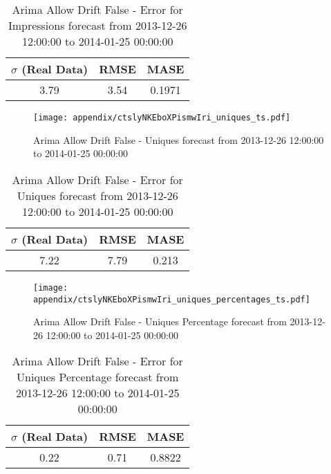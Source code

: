 \begin{table}[H]
\centering
\footnotesize
\begin{tabular}{ccc}
$\sigma$ (Real Data) & RMSE & MASE   \\ \hline
3.79 & 3.54 & 0.1971 \\
\end{tabular}

\vspace{0.5cm}

\caption{
Arima Allow Drift False - Error for Impressions forecast from 2013-12-26 12:00:00 to 2014-01-25 00:00:00}
\end{table}

\begin{figure}[H] \begin{center} \leavevmode
\texttt{[image: appendix/ctslyNKEboXPismwIri\_uniques\_ts.pdf]} \caption{
Arima Allow Drift False - Uniques forecast from 2013-12-26 12:00:00 to 2014-01-25 00:00:00} \label{fig:appendix/ctslyNKEboXPismwIri_uniques_ts.pdf} \end{center}
\end{figure}

\begin{table}[H]
\centering
\footnotesize
\begin{tabular}{ccc}
$\sigma$ (Real Data) & RMSE & MASE   \\ \hline
7.22 & 7.79 & 0.213 \\
\end{tabular}

\vspace{0.5cm}

\caption{
Arima Allow Drift False - Error for Uniques forecast from 2013-12-26 12:00:00 to 2014-01-25 00:00:00}
\end{table}

\begin{figure}[H] \begin{center} \leavevmode
\texttt{[image: appendix/ctslyNKEboXPismwIri\_uniques\_percentages\_ts.pdf]} \caption{
Arima Allow Drift False - Uniques Percentage forecast from 2013-12-26 12:00:00 to 2014-01-25 00:00:00} \label{fig:appendix/ctslyNKEboXPismwIri_uniques_percentages_ts.pdf} \end{center}
\end{figure}

\begin{table}[H]
\centering
\footnotesize
\begin{tabular}{ccc}
$\sigma$ (Real Data) & RMSE & MASE   \\ \hline
0.22 & 0.71 & 0.8822 \\
\end{tabular}

\vspace{0.5cm}

\caption{
Arima Allow Drift False - Error for Uniques Percentage forecast from 2013-12-26 12:00:00 to 2014-01-25 00:00:00}
\end{table}

